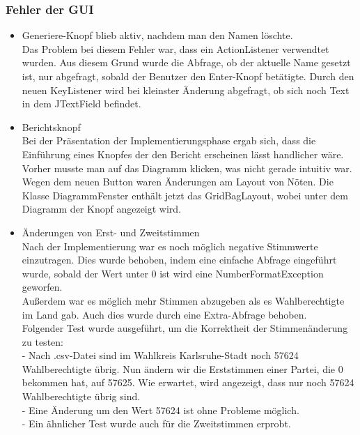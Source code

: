 \documentclass[12pt,a4paper,titlepage]{article}
\begin{document}
\subsubsection{Fehler der GUI}
\begin{itemize}
\item Generiere-Knopf blieb aktiv, nachdem man den Namen löschte. \\
Das Problem bei diesem Fehler war, dass ein ActionListener verwendtet wurden. Aus diesem Grund wurde die
Abfrage, ob der aktuelle Name gesetzt ist, nur abgefragt, sobald der Benutzer den Enter-Knopf betätigte.
Durch den neuen KeyListener wird bei kleinster Änderung abgefragt, ob sich noch Text in dem JTextField befindet. \\

\item Berichtsknopf \\
Bei der Präsentation der Implementierungsphase ergab sich, dass die Einführung eines Knopfes der den Bericht erscheinen
lässt handlicher wäre. Vorher musste man auf das Diagramm klicken, was nicht gerade intuitiv war. \\
Wegen dem neuen Button waren Änderungen am Layout von Nöten. Die Klasse DiagrammFenster enthält jetzt das GridBagLayout,
wobei unter dem Diagramm der Knopf angezeigt wird. \\

\item Änderungen von Erst- und Zweitstimmen \\
Nach der Implementierung war es noch möglich negative Stimmwerte einzutragen. Dies wurde behoben, indem eine einfache Abfrage eingeführt wurde, sobald der Wert unter 0 ist wird eine NumberFormatException geworfen. \\
Außerdem war es möglich mehr Stimmen abzugeben als es Wahlberechtigte im Land gab. Auch dies wurde durch eine Extra-Abfrage behoben. \\
Folgender Test wurde ausgeführt, um die Korrektheit der Stimmenänderung zu testen:\\
- Nach .csv-Datei sind im Wahlkreis Karlsruhe-Stadt noch 57624 Wahlberechtigte übrig. Nun ändern wir die Erststimmen einer Partei, die 0 bekommen hat, auf 57625. Wie erwartet, wird angezeigt, dass nur noch 57624 Wahlberechtigte übrig sind. \\
- Eine Änderung um den Wert 57624 ist ohne Probleme möglich.\\
- Ein ähnlicher Test wurde auch für die Zweitstimmen erprobt.\\


\end{itemize}
\end{document}
